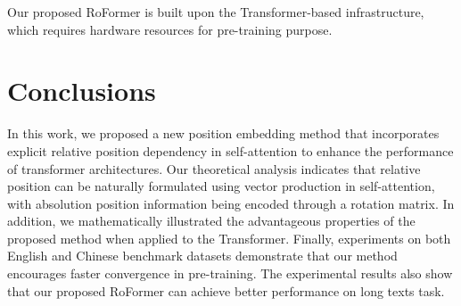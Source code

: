 Our proposed RoFormer is built upon the  Transformer-based infrastructure, which requires  hardware resources for pre-training purpose.

\section{Conclusions} \label{sec:conclu}

In this work, we proposed a new position embedding method that incorporates explicit relative position dependency in self-attention to enhance the performance of transformer architectures. Our theoretical analysis indicates that relative position can be naturally formulated using vector production in self-attention, with absolution position information being encoded through a rotation matrix. In addition, we mathematically illustrated the advantageous properties of the proposed method when applied to the Transformer. Finally, experiments on both English and Chinese benchmark datasets demonstrate that our method encourages faster convergence in pre-training. The experimental results also show that our proposed RoFormer can achieve better performance on long texts task. 



